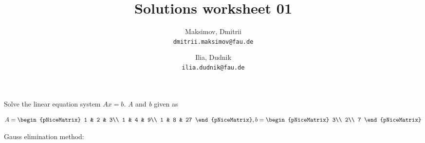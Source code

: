 \documentclass{homework}
\title{Solutions worksheet 01}
\author{
  Maksimov, Dmitrii\\
  \texttt{dmitrii.maksimov@fau.de}
  \and
  Ilia, Dudnik\\
  \texttt{ilia.dudnik@fau.de}
}
\begin{document}
\maketitle

Solve the linear equation system $Ax=b$. \emph{A} and \emph{b} given as

$$
A = \begin{pNiceMatrix}
1 & 2 & 3\\
1 & 4 & 9\\
1 & 8 & 27
\end{pNiceMatrix}
, b= \begin{pNiceMatrix}
3\\
2\\
7
\end{pNiceMatrix}
$$

Gauss elimination method:
\end{document}
